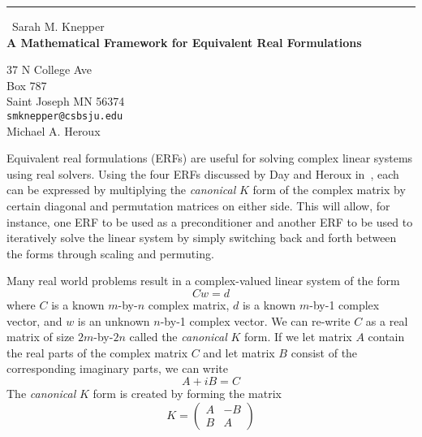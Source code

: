 \documentclass{report}
\begin{document}
\begin{center}
\rule{6in}{1pt} \
{\large Sarah M. Knepper \\
{\bf A Mathematical Framework for Equivalent Real Formulations}}

37 N College Ave \\ Box 787 \\ Saint Joseph MN 56374
\\
{\tt smknepper@csbsju.edu}\\
Michael A. Heroux\end{center}

Equivalent real formulations (ERFs) are useful for solving complex linear
systems using real solvers. Using the four ERFs discussed by Day and
Heroux in~\cite{Day}, each can be expressed by multiplying the
\emph{canonical} $K$ form of the complex matrix by certain diagonal and
permutation matrices on either side. This will allow, for instance, one
ERF to be used as a preconditioner and another ERF to be used to
iteratively solve the linear system by simply switching back and forth
between the forms through scaling and permuting.

Many real world problems result in a complex-valued linear system of the form
\begin{equation*} \label{complex} C w = d \end{equation*}
where $C$ is a known $m$-by-$n$ complex matrix, $d$ is a known
$m$-by-1 complex vector, and $w$ is an unknown $n$-by-1 complex
vector. We can re-write $C$ as a real matrix of size $2m$-by-$2n$ called
the \emph{canonical} $K$ form. If we let matrix $A$ contain the real
parts of the complex matrix $C$ and let matrix $B$ consist of the
corresponding imaginary parts, we can write
\begin{equation*} \label{abequation} A + i B = C \end{equation*}
The \emph{canonical} $K$ form is created by forming the matrix
\begin{equation*} \label{canonk} K = \left( \begin{array}{rr} A & -B \\ B
& A \end{array} \right) \end{equation*}
\end{document}

